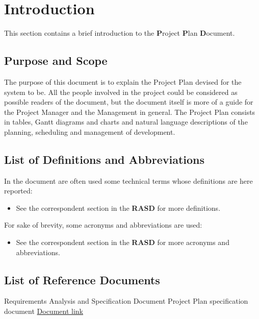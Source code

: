 \section{Introduction}
This section contains a brief introduction to the \textbf{P}roject \textbf{P}lan \textbf{D}ocument.
%
\subsection{Purpose and Scope}
The purpose of this document is to explain the Project Plan devised for the system to be.
All the people involved in the project could be considered as possible readers of the document, but the document itself is more of a guide for the Project Manager and the Management in general.
The Project Plan consists in tables, Gantt diagrams and charts and natural language descriptions of the planning, scheduling and management of \myTaxiService{} development.
%
\subsection{List of Definitions and Abbreviations}
In the document are often used some technical terms whose definitions are here reported:
\begin{itemize}
	\item See the correspondent section in the \textbf{RASD} for more definitions.
\end{itemize}
For sake of brevity, some acronyms and abbreviations are used:
\begin{itemize}
	 Project Plan Document.
	 Function Points.
	 Internal Logic File.
	 External Logic File.
	 External Input.
	 External Output.
	 External Inquiry.
	 Constructive Cost Model.
	\item See the correspondent section in the \textbf{RASD} for more acronyms and abbreviations.
\end{itemize}
%
\subsection{List of Reference Documents}
\begin{itemize}
	 Requirements Analysis and Specification Document
	 Project Plan specification document
	 \href{http://csse.usc.edu/csse/research/COCOMOII/cocomo2000.0/CII_modelman2000.0.pdf}{Document link}
\end{itemize}
%